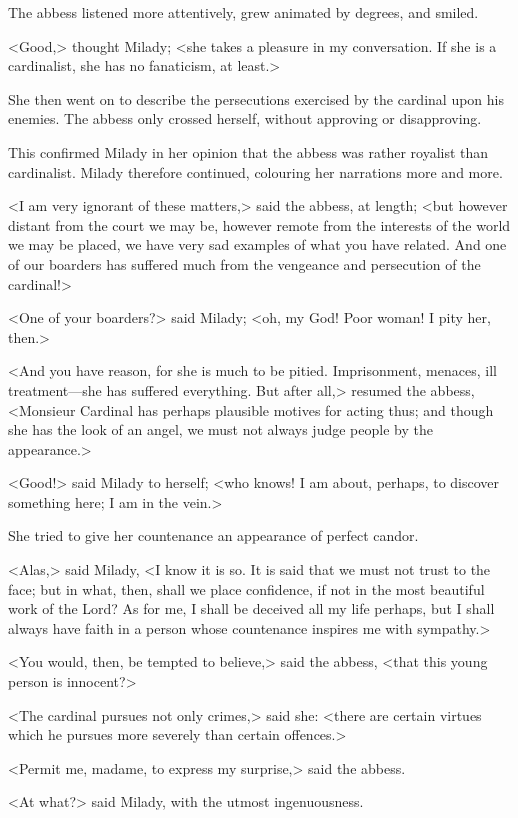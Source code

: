 The abbess listened more attentively, grew animated by degrees, and smiled. 

<Good,> thought Milady; <she takes a pleasure in my conversation. If she is a cardinalist, she has no fanaticism, at least.> 

She then went on to describe the persecutions exercised by the cardinal upon his enemies. The abbess only crossed herself, without approving or disapproving. 

This confirmed Milady in her opinion that the abbess was rather royalist than cardinalist. Milady therefore continued, colouring her narrations more and more. 

<I am very ignorant of these matters,> said the abbess, at length; <but however distant from the court we may be, however remote from the interests of the world we may be placed, we have very sad examples of what you have related. And one of our boarders has suffered much from the vengeance and persecution of the cardinal!> 

<One of your boarders?> said Milady; <oh, my God! Poor woman! I pity her, then.> 

<And you have reason, for she is much to be pitied. Imprisonment, menaces, ill treatment---she has suffered everything. But after all,> resumed the abbess, <Monsieur Cardinal has perhaps plausible motives for acting thus; and though she has the look of an angel, we must not always judge people by the appearance.> 

<Good!> said Milady to herself; <who knows! I am about, perhaps, to discover something here; I am in the vein.> 

She tried to give her countenance an appearance of perfect candor. 

<Alas,> said Milady, <I know it is so. It is said that we must not trust to the face; but in what, then, shall we place confidence, if not in the most beautiful work of the Lord? As for me, I shall be deceived all my life perhaps, but I shall always have faith in a person whose countenance inspires me with sympathy.> 

<You would, then, be tempted to believe,> said the abbess, <that this young person is innocent?> 

<The cardinal pursues not only crimes,> said she: <there are certain virtues which he pursues more severely than certain offences.> 

<Permit me, madame, to express my surprise,> said the abbess. 

<At what?> said Milady, with the utmost ingenuousness. 

